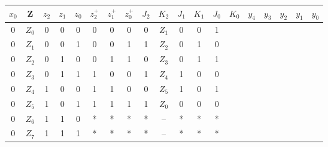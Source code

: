\documentclass[11pt,a4paper]{article}
\begin{document}
\begin{tabular}{c | c | c | c | c | | c | c | c | c | | c | c | c | c}
$x_0$&Z&$z_2$&$z_1$&$z_0$&$z^+_2$&$z^+_1$&$z^+_0$&$J_2$&$K_2$&$J_1$&$K_1$&$J_0$&$K_0$&$y_4$&$y_3$&$y_2$&$y_1$&$y_0$& \\ &$Z_0$&0&0&0&0&0&0&0&$Z_1$&0&0&1\\
0&$Z_1$&0&0&1&0&0&1&1&$Z_2$&0&1&0\\
0&$Z_2$&0&1&0&0&1&1&0&$Z_3$&0&1&1\\
0&$Z_3$&0&1&1&1&0&0&1&$Z_4$&1&0&0\\
0&$Z_4$&1&0&0&1&1&0&0&$Z_5$&1&0&1\\
0&$Z_5$&1&0&1&1&1&1&1&$Z_0$&0&0&0\\
0&$Z_6$&1&1&0&*&*&*&*&--&*&*&*\\
0&$Z_7$&1&1&1&*&*&*&*&--&*&*&*\\ \hline

\end{tabular}\\
\end{document}
